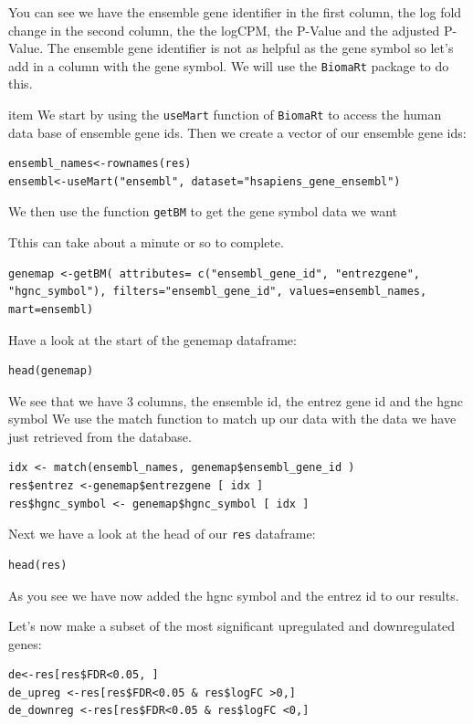\begin{information}
You can see we have the ensemble gene identifier in the first column, the log fold change
in the second column, the the logCPM, the P-Value and the adjusted P-Value. The ensemble
gene identifier is not as helpful as the gene symbol so let's add in a column with the
gene symbol. We will use the \texttt{BiomaRt} package to do this.
\end{information}

\begin{steps}
item We start by using the \texttt{useMart} function of \texttt{BiomaRt} to access the
human data base of ensemble gene ids. Then we create a vector of our ensemble gene ids:
\begin{lstlisting}
ensembl_names<-rownames(res)
ensembl<-useMart("ensembl", dataset="hsapiens_gene_ensembl")
\end{lstlisting}

We then use the function \texttt{getBM} to get the gene symbol data we want 
\begin{note}
Tthis can take about a minute or so to complete.
\end{note}
\begin{lstlisting}
genemap <-getBM( attributes= c("ensembl_gene_id", "entrezgene", "hgnc_symbol"), filters="ensembl_gene_id", values=ensembl_names, mart=ensembl)
\end{lstlisting}

Have a look at the start of the genemap dataframe:
\begin{lstlisting}
head(genemap)
\end{lstlisting}

We see that we have 3 columns, the ensemble id, the entrez gene id and the hgnc symbol
We use the match function to match up our data with the data we have just retrieved from
the database.

\begin{lstlisting}
idx <- match(ensembl_names, genemap$ensembl_gene_id )
res$entrez <-genemap$entrezgene [ idx ]
res$hgnc_symbol <- genemap$hgnc_symbol [ idx ]
\end{lstlisting}

Next we have a look at the head of our \texttt{res} dataframe:
\begin{lstlisting}
head(res)
\end{lstlisting}
As you see we have now added the hgnc symbol and the entrez id to our results.




Let's now make a subset of the most significant upregulated and downregulated genes:
\begin{lstlisting}
de<-res[res$FDR<0.05, ]
de_upreg <-res[res$FDR<0.05 & res$logFC >0,] 
de_downreg <-res[res$FDR<0.05 & res$logFC <0,] 
\end{lstlisting}

\end{steps}

